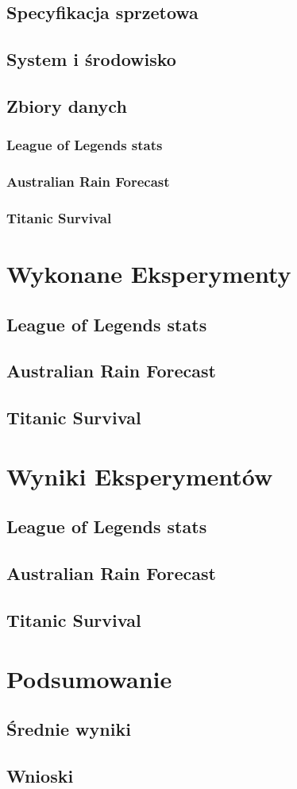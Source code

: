 \documentclass{article}
\begin{document}
\subsection{Specyfikacja sprzetowa}
\subsection{System i środowisko}
\subsection{Zbiory danych}
\subsubsection{League of Legends stats}
\subsubsection{Australian Rain Forecast}
\subsubsection{Titanic Survival}

\section{Wykonane Eksperymenty}
\subsection{League of Legends stats}
\subsection{Australian Rain Forecast}
\subsection{Titanic Survival}

\section{Wyniki Eksperymentów}
\subsection{League of Legends stats}
\subsection{Australian Rain Forecast}
\subsection{Titanic Survival}

\section{Podsumowanie}
\subsection{Średnie wyniki}
\subsection{Wnioski}
\end{document}
